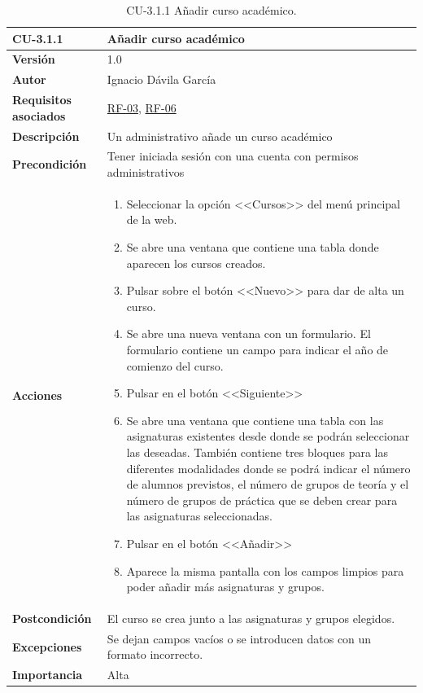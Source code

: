 \begin{table}[p]
\label{table:CU-3.1.1}
	\centering
	\begin{tabularx}{\linewidth}{ p{} p{} }
		\toprule
		\textbf{CU-3.1.1}    & \textbf{Añadir curso académico}\\
		\toprule
		\textbf{Versión}              & 1.0    \\
		\textbf{Autor}                & Ignacio Dávila García \\
		\textbf{Requisitos asociados} & \hyperref[itm:RF3]{RF-03}, \hyperref[itm:RF6]{RF-06} \\
		\textbf{Descripción}          & Un administrativo añade un curso académico \\
		\textbf{Precondición}         & Tener iniciada sesión con una cuenta con permisos administrativos \\
		\textbf{Acciones}             &
		\begin{enumerate}
			\def\labelenumi{\arabic{enumi}.}
			\tightlist
			\item Seleccionar la opción <<Cursos>> del menú principal de la web.
			\item Se abre una ventana que contiene una tabla donde aparecen los cursos creados.
			\item Pulsar sobre el botón <<Nuevo>> para dar de alta un curso.
			\item Se abre una nueva ventana con un formulario. El formulario contiene un campo para indicar el año de comienzo del curso.
			\item Pulsar en el botón <<Siguiente>>
			\item Se abre una ventana que contiene una tabla con las asignaturas existentes desde donde se podrán seleccionar las deseadas. También contiene tres bloques para las diferentes modalidades donde se podrá indicar el número de alumnos previstos, el número de grupos de teoría y el número de grupos de práctica que se deben crear para las asignaturas seleccionadas.
			\item Pulsar en el botón <<Añadir>>
			\item Aparece la misma pantalla con los campos limpios para poder añadir más asignaturas y grupos.
		\end{enumerate}\\
		\textbf{Postcondición}        & El curso se crea junto a las asignaturas y grupos elegidos. \\
		\textbf{Excepciones}          & Se dejan campos vacíos o se introducen datos con un formato incorrecto. \\
		\textbf{Importancia}          & Alta \\
		\bottomrule
	\end{tabularx}
	\caption{CU-3.1.1 Añadir curso académico.}
\end{table}
\FloatBarrier

